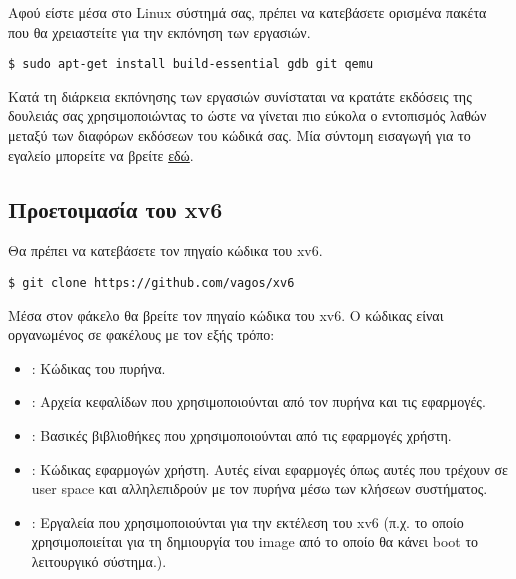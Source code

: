 \documentclass[18pt]{extarticle}
\begin{document}
Αφού είστε μέσα στο Linux σύστημά σας, πρέπει να κατεβάσετε ορισμένα πακέτα που θα χρειαστείτε για την εκπόνηση των εργασιών.

\begin{commandline}
\begin{verbatim}
$ sudo apt-get install build-essential gdb git qemu
\end{verbatim}
\end{commandline}

Κατά τη διάρκεια εκπόνησης των εργασιών συνίσταται να κρατάτε εκδόσεις της δουλειάς σας χρησιμοποιώντας το 
ώστε να γίνεται πιο εύκολα ο εντοπισμός λαθών μεταξύ των διαφόρων εκδόσεων του κώδικά σας.
Μία σύντομη εισαγωγή για το εγαλείο μπορείτε να βρείτε \href{https://rogerdudler.github.io/git-guide/}{εδώ}. 

\subsection{Προετοιμασία του xv6}

Θα πρέπει να κατεβάσετε τον πηγαίο κώδικα του xv6.

\begin{commandline}
\begin{verbatim}
$ git clone https://github.com/vagos/xv6
\end{verbatim}
\end{commandline}

Μέσα στον φάκελο  θα βρείτε τον πηγαίο κώδικα του xv6.
Ο κώδικας είναι οργανωμένος σε φακέλους με τον εξής τρόπο: 

\begin{itemize}[label={--}]
    \item {}: Κώδικας του πυρήνα.
    \item {}: Αρχεία κεφαλίδων που χρησιμοποιούνται από τον πυρήνα και τις εφαρμογές.
    \item {}: Βασικές βιβλιοθήκες που χρησιμοποιούνται από τις εφαρμογές χρήστη.
    \item {}: Κώδικας εφαρμογών χρήστη. Αυτές είναι εφαρμογές όπως αυτές που τρέχουν σε user space και αλληλεπιδρούν με τον πυρήνα μέσω των κλήσεων συστήματος.
    \item {}: Εργαλεία που χρησιμοποιούνται για την εκτέλεση του xv6 (π.χ.  το οποίο χρησιμοποιείται για τη δημιουργία του image από το οποίο θα κάνει boot το λειτουργικό σύστημα.).
\end{itemize}
\end{document}
